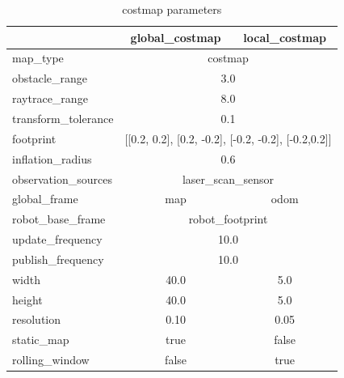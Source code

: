 \documentclass[10pt,journal,compsoc]{IEEEtran}
\begin{document}
\begin{table}[H]
\centering
\begin{tabular}{|l|c|c|}
\hline
\rowcolor[HTML]{C0C0C0} 
\multicolumn{1}{|c|}{\cellcolor[HTML]{C0C0C0}\textbf{Udacity and R2D2}} & \textbf{global\_costmap} & \textbf{local\_costmap} \\ \hline
map\_type            & \multicolumn{2}{c|}{costmap}                                                                 \\ \hline
obstacle\_range      & \multicolumn{2}{c|}{3.0}                                                                     \\ \hline
raytrace\_range      & \multicolumn{2}{c|}{8.0}                                                                     \\ \hline
transform\_tolerance & \multicolumn{2}{c|}{0.1}                                                                     \\ \hline
footprint            & \multicolumn{2}{c|}{{[}{[}0.2, 0.2{]}, {[}0.2, -0.2{]}, {[}-0.2, -0.2{]}, {[}-0.2,0.2{]}{]}} \\ \hline
inflation\_radius   & \multicolumn{2}{c|}{0.6}                                                                     \\ \hline
observation\_sources & \multicolumn{2}{c|}{laser\_scan\_sensor}                                                     \\ \hline
global\_frame        & map                      & odom                    \\ \hline
robot\_base\_frame   & \multicolumn{2}{c|}{robot\_footprint}              \\ \hline
update\_frequency    & \multicolumn{2}{c|}{10.0}                          \\ \hline
publish\_frequency   & \multicolumn{2}{c|}{10.0}                          \\ \hline
width                & 40.0                     & 5.0                     \\ \hline
height               & 40.0                     & 5.0                     \\ \hline
resolution           & 0.10                     & 0.05                    \\ \hline
static\_map          & true                     & false                   \\ \hline
rolling\_window      & false                    & true                    \\ \hline
\end{tabular}
\caption{costmap parameters}
\label{tab:costmap-param}
\end{table}
\end{document}
